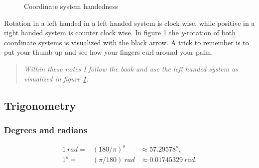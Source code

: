 \documentclass[a4paper,11pt]{article}
\begin{document}
\begin{figure}[H]
\centering
\caption{Coordinate system handedness}
\label{fig:coordinate-system-handedness}
\end{figure}

Rotation in a left handed in a left handed system is clock wise, while positive in a right handed system is counter clock wise. In figure  \ref{fig:coordinate-system-handedness} the $y$-rotation of both  coordinate systems is visualized with the black arrow. A trick to remember is to put your thumb up and see how your fingers curl around your palm.

\begin{quote}
\emph{Within these notes I follow the book and use the left handed system as visualized in figure \ref{fig:coordinate-system-handedness}.}
\end{quote}

\subsection{Trigonometry}

\subsubsection{Degrees and radians}

\[
\begin{array}{rll}
{1\ {rad} =} & {\left( 180/\pi \right)^{o}} & {\approx 57.29578^{o},} \\
{1^{o} =} & {\left( \pi/180 \right)\ {rad}} & {\approx 0.01745329\ {rad}.} \\
\end{array}
\]
\end{document}
